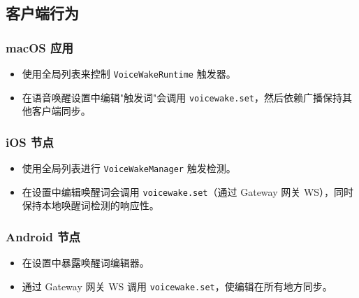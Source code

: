 \subsection{客户端行为}


\subsubsection{macOS 应用}


\begin{itemize}
  \item 使用全局列表来控制 \texttt{VoiceWakeRuntime} 触发器。
  \item 在语音唤醒设置中编辑"触发词"会调用 \texttt{voicewake.set}，然后依赖广播保持其他客户端同步。
\end{itemize}


\subsubsection{iOS 节点}


\begin{itemize}
  \item 使用全局列表进行 \texttt{VoiceWakeManager} 触发检测。
  \item 在设置中编辑唤醒词会调用 \texttt{voicewake.set}（通过 Gateway 网关 WS），同时保持本地唤醒词检测的响应性。
\end{itemize}


\subsubsection{Android 节点}


\begin{itemize}
  \item 在设置中暴露唤醒词编辑器。
  \item 通过 Gateway 网关 WS 调用 \texttt{voicewake.set}，使编辑在所有地方同步。
\end{itemize}



\clearpage
